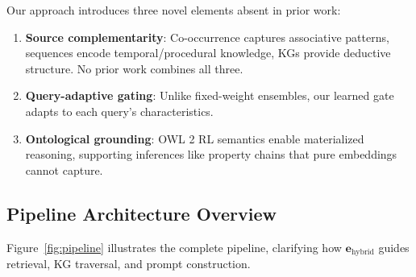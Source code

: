 \documentclass[10pt,twocolumn]{article}
\begin{document}
Our approach introduces three novel elements absent in prior work:

\begin{enumerate}
    \item \textbf{Source complementarity}: Co-occurrence captures associative patterns, sequences encode temporal/procedural knowledge, KGs provide deductive structure. No prior work combines all three.
    \item \textbf{Query-adaptive gating}: Unlike fixed-weight ensembles, our learned gate adapts to each query's characteristics.
    \item \textbf{Ontological grounding}: OWL 2 RL semantics enable materialized reasoning, supporting inferences like property chains that pure embeddings cannot capture.
\end{enumerate}


\subsection{Pipeline Architecture Overview}
\label{sec:pipeline}

Figure~\ref{fig:pipeline} illustrates the complete pipeline, clarifying how $\mathbf{e}_{\text{hybrid}}$ guides retrieval, KG traversal, and prompt construction.
\end{document}
